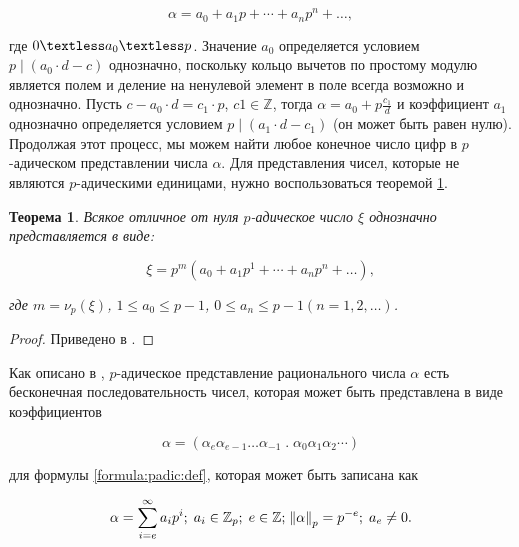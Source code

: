 \documentclass[master, och, diploma, times]{sty/SCWorks}
\theoremstyle{plain}
\newtheorem{thethm}{Теорема}[section]
\theoremstyle{definition}
\numberwithin{equation}{section}
\begin{document}
\begin{equation}\label{formula:padic:def}
\alpha=a_0+a_1p+\cdots+a_np^n+\dots,
\end{equation}

\noindent где $0 \textless a_0 \textless p$. Значение $a_0$ определяется условием $p \mid (a_0 \cdot d-c)$ однозначно, поскольку кольцо вычетов по простому модулю является полем и деление на ненулевой элемент в поле всегда возможно и однозначно. Пусть $c-a_0 \cdot d=c_1 \cdot p$, $c1 \in \mathbb{Z}$, тогда $\alpha=a_0+p\frac{c_1}{d}$ и коэффициент $a_1$ однозначно определяется условием $p \mid (a_1 \cdot d-c_1)$ (он может быть равен нулю). Продолжая этот процесс, мы можем найти любое конечное число цифр в $p$-адическом представлении числа $\alpha$. Для представления чисел, которые не являются $p$-адическими единицами, нужно воспользоваться теоремой \ref{th:numbers:representation}.

\begin{thethm}\label{th:numbers:representation}
Всякое отличное от нуля $p$-адическое число $\xi$ однозначно представляется в виде:

\begin{equation}
\xi=p^m(a_0+a_1p^1+\cdots+a_np^n+\dots),
\end{equation}

\noindent где $m=\nu_p(\xi)$, $1 \le a_0 \le p-1$, $0 \le a_n \le p-1$$(n=1,2,\dots)$.
\end{thethm}

\begin{proof}
Приведено в \cite{bib:number:borevich}.
\end{proof}


Как описано в \cite{bib:analysis:schikhof}, $p$-адическое представление рационального числа $\alpha$ есть бесконечная последовательность чисел, которая может быть представлена в виде коэффициентов

\begin{equation}\label{formula:numbers:2}
\alpha=(\alpha_{e}\alpha_{e-1}\dots\alpha_{-1} \; . \; \alpha_0\alpha_1\alpha_2\cdots)
\end{equation}

\noindent для формулы \ref{formula:padic:def}, которая может быть записана как

\begin{equation}
\alpha=\sum\limits_{i=e}^{\infty} a_ip^i; \; a_i \in \mathbb{Z}_p; \; e \in \mathbb{Z}; \; \norm{\alpha}_p=p^{-e}; \; a_e \neq 0.
\end{equation}
\end{document}
